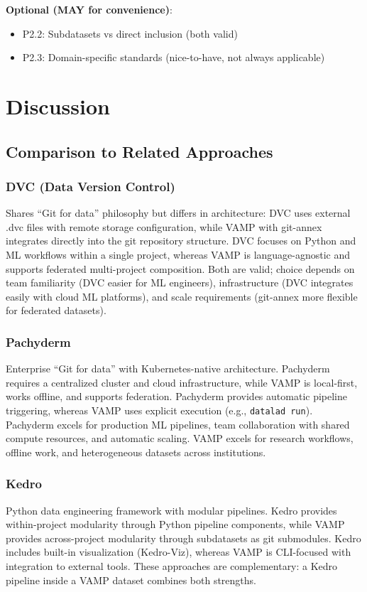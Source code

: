 \documentclass{article}
\begin{document}
\textbf{Optional (MAY for convenience)}:
\begin{itemize}
    \item P2.2: Subdatasets vs direct inclusion (both valid)
    \item P2.3: Domain-specific standards (nice-to-have, not always applicable)
\end{itemize}

\section{Discussion}

\subsection{Comparison to Related Approaches}

\subsubsection{DVC (Data Version Control)}
Shares ``Git for data'' philosophy but differs in architecture:
DVC uses external .dvc files with remote storage configuration, while VAMP with git-annex integrates directly into the git repository structure.
DVC focuses on Python and ML workflows within a single project, whereas VAMP is language-agnostic and supports federated multi-project composition.
Both are valid; choice depends on team familiarity (DVC easier for ML engineers), infrastructure (DVC integrates easily with cloud ML platforms), and scale requirements (git-annex more flexible for federated datasets).

\subsubsection{Pachyderm}
Enterprise ``Git for data'' with Kubernetes-native architecture.
Pachyderm requires a centralized cluster and cloud infrastructure, while VAMP is local-first, works offline, and supports federation.
Pachyderm provides automatic pipeline triggering, whereas VAMP uses explicit execution (e.g., \texttt{datalad run}).
Pachyderm excels for production ML pipelines, team collaboration with shared compute resources, and automatic scaling.
VAMP excels for research workflows, offline work, and heterogeneous datasets across institutions.

\subsubsection{Kedro}
Python data engineering framework with modular pipelines.
Kedro provides within-project modularity through Python pipeline components, while VAMP provides across-project modularity through subdatasets as git submodules.
Kedro includes built-in visualization (Kedro-Viz), whereas VAMP is CLI-focused with integration to external tools.
These approaches are complementary: a Kedro pipeline inside a VAMP dataset combines both strengths.
\end{document}

